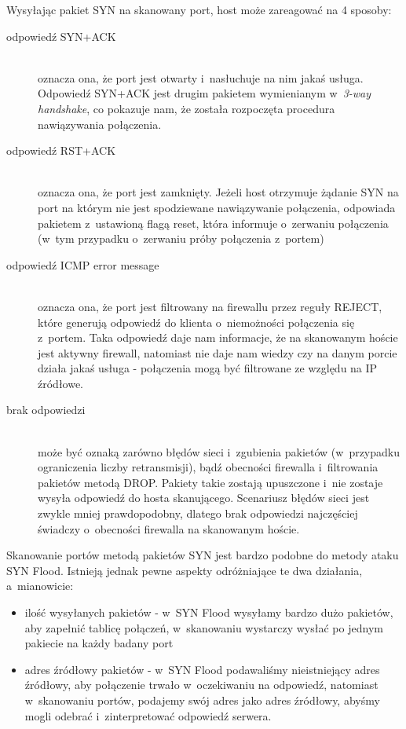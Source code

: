 \documentclass[a4paper,12pt,oneside]{book}
\begin{document}
			Wysyłając pakiet SYN na skanowany port, host może zareagować na 4 sposoby:
			\begin{description}
			\item[odpowiedź SYN+ACK]\hfill \\
			oznacza ona, że port jest otwarty i~nasłuchuje na nim jakaś usługa.
			Odpowiedź SYN+ACK jest drugim pakietem wymienianym w~\textit{3-way handshake}, co pokazuje nam, że została rozpoczęta procedura nawiązywania połączenia.
			\item[odpowiedź RST+ACK]\hfill \\
			oznacza ona, że port jest zamknięty.
			Jeżeli host otrzymuje żądanie SYN na port na którym nie jest spodziewane nawiązywanie połączenia, odpowiada pakietem z~ustawioną flagą reset, która informuje o~zerwaniu połączenia (w~tym przypadku o~zerwaniu próby połączenia z~portem)
			\item[odpowiedź ICMP error message]\hfill \\
			oznacza ona, że port jest filtrowany na firewallu przez reguły REJECT, które generują odpowiedź do klienta o~niemożności połączenia się z~portem.
			Taka odpowiedź daje nam informacje, że na skanowanym hoście jest aktywny firewall, natomiast nie daje nam wiedzy czy na danym porcie działa jakaś usługa - połączenia mogą być filtrowane ze względu na IP źródłowe.
			\item[brak odpowiedzi]\hfill \\
			może być oznaką zarówno błędów sieci i~zgubienia pakietów (w~przypadku ograniczenia liczby retransmisji), bądź obecności firewalla i~filtrowania pakietów metodą DROP.
			Pakiety takie zostają upuszczone i~nie zostaje wysyła odpowiedź do hosta skanującego.
			Scenariusz błędów sieci jest zwykle mniej prawdopodobny, dlatego brak odpowiedzi najczęściej świadczy o~obecności firewalla na skanowanym hoście.
			\end{description}
			
			Skanowanie portów metodą pakietów SYN jest bardzo podobne do metody ataku SYN Flood.
			Istnieją jednak pewne aspekty odróżniające te dwa działania, a~mianowicie:
			\begin{itemize}
			\item ilość wysyłanych pakietów - w~SYN Flood wysyłamy bardzo dużo pakietów, aby zapełnić tablicę połączeń, w~skanowaniu wystarczy wysłać po jednym pakiecie na każdy badany port
			\item adres źródłowy pakietów - w~SYN Flood podawaliśmy nieistniejący adres źródłowy, aby połączenie trwało w~oczekiwaniu na odpowiedź,
			natomiast w~skanowaniu portów, podajemy swój adres jako adres źródłowy, abyśmy mogli odebrać i~zinterpretować odpowiedź serwera.
			\end{itemize}
\end{document}
